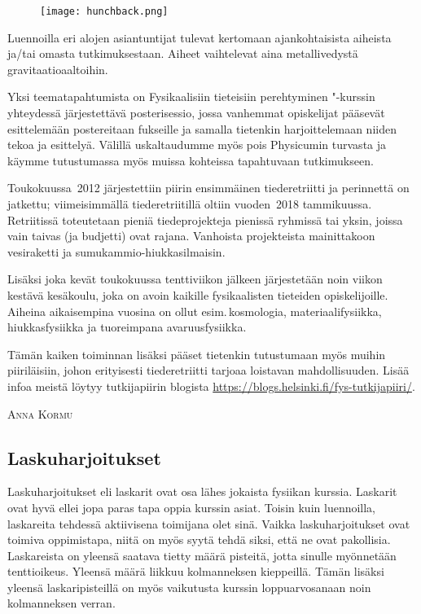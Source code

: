 \documentclass[../ala_hataile.tex]{subfiles}
\begin{document}
	\begin{figure}[b!]
		\texttt{[image: hunchback.png]}
	\end{figure}
	Luennoilla eri alojen asian\-tuntijat tulevat kertomaan ajankohtaisista aiheista
	ja/tai omasta tutkimuksestaan. Aiheet vaihtelevat aina metalli\-vedystä 
	gravitaatio\-aaltoihin.
	
	Yksi teema\-tapahtumista on Fysikaalisiin tieteisiin perehtyminen "-kurssin 
	yhteydessä järjestettävä posteri\-sessio, jossa vanhemmat opiskelijat 
	pääsevät esittelemään postereitaan fukseille ja samalla tietenkin 
	harjoittelemaan niiden tekoa ja esittelyä. Välillä uskaltaudumme myös pois Physicumin turvasta ja käymme 
	tutustumassa myös muissa kohteissa tapahtuvaan tutkimukseen.
	
	Toukokuussa~2012 järjestettiin piirin ensimmäinen tiede\-retriitti ja 
	perinnettä on jatkettu; viimeisimmällä tiede\-retriitillä oltiin vuoden~2018 tammikuussa. Retriitissä toteutetaan pieniä tiede\-projekteja 
	pienissä ryhmissä tai yksin, joissa vain taivas (ja budjetti) ovat rajana. 
	Vanhoista projekteista mainittakoon vesi\-raketti ja sumu\-kammio-hiukkas\-ilmaisin.
	
	Lisäksi joka kevät touko\-kuussa tentti\-viikon jälkeen järjestetään noin viikon 
	kestävä kesäkoulu, joka on avoin kaikille fysikaalisten tieteiden opiskelijoille. 
	Aiheina aikaisempina vuosina on ollut esim.\,kosmologia, materiaali\-fysiikka, 
	hiukkas\-fysiikka ja tuoreimpana avaruus\-fysiikka.
	
	Tämän kaiken toiminnan lisäksi pääset tietenkin tutustumaan myös muihin piiriläisiin, johon erityisesti tiede\-retriitti tarjoaa loistavan mahdollisuuden. 
	Lisää infoa meistä löytyy tutkija\-piirin blogista \url{https://blogs.helsinki.fi/fys-tutkijapiiri/}.
	
	\vspace{0.5cm}
	\noindent\textsc{Anna Kormu}
	
	\subsection*{Laskuharjoitukset}
	Laskuharjoitukset eli laskarit ovat osa
	lähes jokaista fysiikan kurssia.
	Laskarit ovat hyvä ellei jopa paras tapa
	oppia kurssin asiat. Toisin kuin luennoilla,
	laskareita tehdessä aktiivisena toimijana
	olet sinä. Vaikka lasku\-harjoitukset ovat toimiva
	oppimistapa, niitä on myös syytä tehdä
	siksi, että ne ovat pakollisia. Laskareista
	on yleensä saatava tietty määrä pisteitä, jotta
	sinulle myönnetään tentti\-oikeus. Yleensä
	määrä liikkuu kolmanneksen kieppeillä.
	Tämän lisäksi yleensä laskari\-pisteillä on
	myös vaikutusta kurssin loppu\-arvo\-sanaan
	noin kolmanneksen verran.
	
\end{document}
